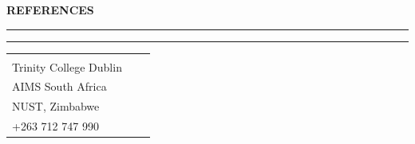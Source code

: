 \documentclass[a4paper,10pt]{article}
\newcommand{\cvsection}[1]{%
  \par\penalty-180\vspace{0.95em}%
  {\bfseries\fontsize{11.5}{12}\selectfont\color{cvblue}\MakeUppercase{#1}}%
  \par\nobreak\nointerlineskip\vspace{0.52em}%
  \noindent\textcolor{cvlime}{\rule{2.4em}{1.6pt}}%
  \textcolor{cvmist}{\rule{\dimexpr\textwidth-2.4em\relax}{1.6pt}}%
  \par\nobreak\nointerlineskip\vspace{0.42em}\nobreak%
}
\newcommand{\cvref}[3]{%
  {\bfseries\color{cvnavy}#1}\par
  {\small\itshape\color{cvblue}#2}\par
  {\small\color{cvink}#3}\par
}
\begin{document}
\cvsection{References}

\noindent\begin{tabularx}{\textwidth}{@{}XXX@{}}
\begin{minipage}[t]{\linewidth}
\cvref{Assistant Prof.\ Silvia D'Angelo}{PhD Supervisor\\Trinity College Dublin}{\href{mailto:dangelos@tcd.ie}{dangelos@tcd.ie}}
\end{minipage} &
\begin{minipage}[t]{\linewidth}
\cvref{Dr Mpfareleni Rejoyce Gavhi}{Researcher \& House of Science Manager\\AIMS South Africa}{\href{mailto:rejoyce@aims.ac.za}{rejoyce@aims.ac.za}}
\end{minipage} &
\begin{minipage}[t]{\linewidth}
\cvref{Prof.\ Precious Mdlongwa}{Department Chair in Statistics\\NUST, Zimbabwe}{\href{mailto:precious.mdlongwa@nust.ac.zw}{precious.mdlongwa@nust.ac.zw}\\+263 712 747 990}
\end{minipage}\\
\end{tabularx}
\end{document}
